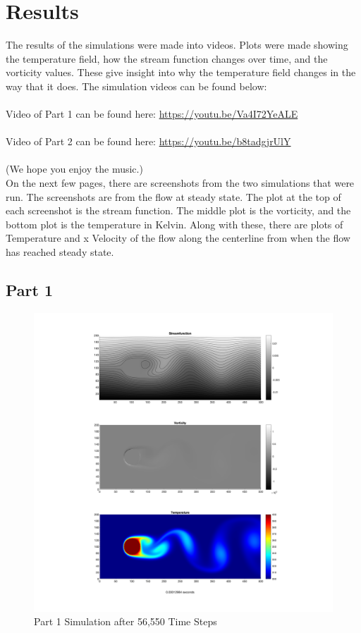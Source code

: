 \section{Results}
 
The results of the simulations were made into videos. Plots were made showing the temperature field, how the stream function changes over time, and the vorticity values. These give insight into why the temperature field changes in the way that it does.  The simulation videos can be found below: \\ \\
Video of Part 1 can be found here: \url{https://youtu.be/Va4I72YeALE}  \\\\
Video of Part 2 can be found here: \url{https://youtu.be/b8tadgjrUlY}  \\ \\
(We hope you enjoy the music.) \\

On the next few pages, there are screenshots from the two simulations that were run. The screenshots are from the flow at steady state. The plot at the top of each screenshot is the stream function. The middle plot is the vorticity, and the bottom plot is the temperature in Kelvin. Along with these, there are plots of Temperature and x Velocity of the flow along the centerline from when the flow has reached steady state. 

\pagebreak
\subsection{Part 1}

\begin{figure}[h]
\includegraphics[width=\linewidth]{images/Final-Project-56550.png}
 \caption{Part 1 Simulation after 56,550 Time Steps}
\end{figure}

